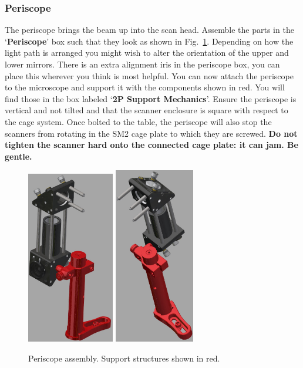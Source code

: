 \documentclass[a4paper]{report}
\begin{document}
\subsubsection{Periscope}
The periscope brings the beam up into the scan head. 
Assemble the parts in the `\textbf{Periscope}' box such that they look as shown in Fig.~\ref{fig:periscope}. 
Depending on how the light path is arranged you might wish to alter the orientation of the upper and lower mirrors. 
There is an extra alignment iris in the periscope box, you can place this wherever you think is most helpful.
You can now attach the periscope to the microscope and support it with the components shown in red. 
You will find those in the box labeled `\textbf{2P Support Mechanics}'.
Ensure the periscope is vertical and not tilted and that the scanner enclosure is square with respect to the cage system. 
Once bolted to the table, the periscope will also stop the scanners from rotating in the SM2 cage plate to which they are screwed.
\textbf{Do not tighten the scanner hard onto the connected cage plate: it can jam. Be gentle.}


\begin{figure}[h]
\center
\includegraphics[width=1.5in]{periscope_01.eps}
\includegraphics[width=1.38in]{periscope_02.eps}
\caption{Periscope assembly. Support structures shown in red.}
\label{fig:periscope}
\end{figure}
\end{document}
